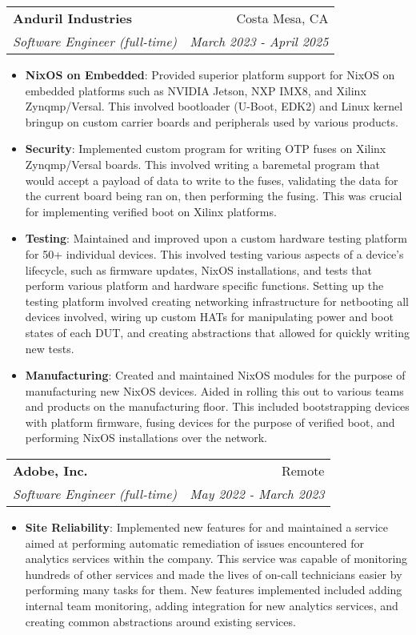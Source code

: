 \documentclass[a4paper,20pt]{article}
\makeatletter
\newcommand{\resumeItem}[2]{\item\small{\textbf{#1}{: #2 \vspace{-2pt}}}}
\newcommand{\resumeSubheading}[4]{
	\vspace{-1pt}\item
	\begin{tabular*}{0.97\textwidth}{l@{\extracolsep{\fill}}r}
		\textbf{#1} & #2 \\
		\textit{#3} & \textit{#4} \\
	\end{tabular*}\vspace{-5pt}
}
\newcommand{\resumeItemListStart}{\begin{itemize}}
\newcommand{\resumeItemListEnd}{\end{itemize}\vspace{-5pt}}
\makeatother
\begin{document}
\resumeSubheading{Anduril Industries}{Costa Mesa, CA}
{Software Engineer (full-time)}{March 2023 - April 2025}
\resumeItemListStart
\resumeItem{NixOS on Embedded}{Provided superior platform support for NixOS on
embedded platforms such as NVIDIA Jetson, NXP IMX8, and Xilinx Zynqmp/Versal.
This involved bootloader (U-Boot, EDK2) and Linux kernel bringup on custom
carrier boards and peripherals used by various products.}
\resumeItem{Security}{Implemented custom program for writing OTP fuses on
Xilinx Zynqmp/Versal boards. This involved writing a baremetal program that
would accept a payload of data to write to the fuses, validating the data for
the current board being ran on, then performing the fusing. This was crucial
for implementing verified boot on Xilinx platforms.}
\resumeItem{Testing}{Maintained and improved upon a custom hardware testing
platform for 50+ individual devices. This involved testing various aspects of a
device's lifecycle, such as firmware updates, NixOS installations, and tests
that perform various platform and hardware specific functions. Setting up the
testing platform involved creating networking infrastructure for netbooting all
devices involved, wiring up custom HATs for manipulating power and boot states
of each DUT, and creating abstractions that allowed for quickly writing new
tests.}
\resumeItem{Manufacturing}{Created and maintained NixOS modules for the purpose
of manufacturing new NixOS devices. Aided in rolling this out to various teams
and products on the manufacturing floor. This included bootstrapping devices
with platform firmware, fusing devices for the purpose of verified boot, and
performing NixOS installations over the network.}
\resumeItemListEnd

\resumeSubheading{Adobe, Inc.}{Remote}
{Software Engineer (full-time)}{May 2022 - March 2023}
\resumeItemListStart
\resumeItem{Site Reliability}{Implemented new features for and maintained a
service aimed at performing automatic remediation of issues encountered for
analytics services within the company. This service was capable of monitoring
hundreds of other services and made the lives of on-call technicians easier by
performing many tasks for them. New features implemented included adding
internal team monitoring, adding integration for new analytics services, and
creating common abstractions around existing services.}
\resumeItemListEnd
\end{document}
